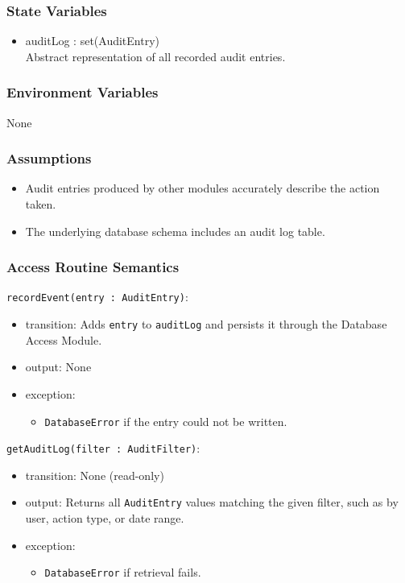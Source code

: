 \documentclass[12pt, titlepage]{article}
\begin{document}
\subsubsection{State Variables}

\begin{itemize}
  \item auditLog : set(AuditEntry) \\
        Abstract representation of all recorded audit entries.
\end{itemize}

\subsubsection{Environment Variables}

None

\subsubsection{Assumptions}

\begin{itemize}
  \item Audit entries produced by other modules accurately describe the action taken.
  \item The underlying database schema includes an audit log table.
\end{itemize}

\subsubsection{Access Routine Semantics}

\noindent\texttt{recordEvent(entry : AuditEntry)}:
\begin{itemize}
  \item transition: Adds \texttt{entry} to \texttt{auditLog} and persists it through
        the Database Access Module.
  \item output: None
  \item exception:
    \begin{itemize}
      \item \texttt{DatabaseError} if the entry could not be written.
    \end{itemize}
\end{itemize}

\noindent\texttt{getAuditLog(filter : AuditFilter)}:
\begin{itemize}
  \item transition: None (read-only)
  \item output: Returns all \texttt{AuditEntry} values matching the given filter,
        such as by user, action type, or date range.
  \item exception:
    \begin{itemize}
      \item \texttt{DatabaseError} if retrieval fails.
    \end{itemize}
\end{itemize}
\end{document}
